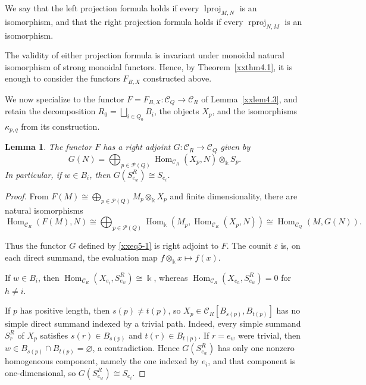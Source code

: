\documentclass{amsart}
\DeclareMathOperator{\lproj}{lproj}
\DeclareMathOperator{\rproj}{rproj}
\newtheorem{lemma}[theorem]{Lemma}
\theoremstyle{definition}
\theoremstyle{remark}
\numberwithin{equation}{section}
\begin{document}
We say that the left projection formula holds if every
$\lproj_{M,N}$
is an isomorphism, and that the right projection formula holds if every
$\rproj_{N,M}$
is an isomorphism.

The validity of either projection formula is invariant under monoidal
natural isomorphism of strong monoidal functors. Hence, by
Theorem~\ref{xxthm4.1}, it is enough to consider
the functors $F_{B,X}$ constructed above.

We now specialize to the functor
$F=F_{B,X}\colon\mathcal C_Q\to\mathcal C_R$
of Lemma~\ref{xxlem4.3}, and retain the
decomposition
$R_0=\bigsqcup_{i\in Q_0}B_i$,
the objects $X_p$, and the isomorphisms $\kappa_{p,q}$ from its
construction.

\begin{lemma}\label{xxlem5.1}
The functor $F$ has a right adjoint
$G\colon\mathcal C_R\to\mathcal C_Q$ given by
\begin{equation}\label{xxeq5-1}
G(N)
=
\bigoplus_{p\in\mathcal P(Q)}
\operatorname{Hom}_{\mathcal C_R}(X_p,N)
\otimes_{\Bbbk}S_p.
\end{equation}
In particular, if
$w\in B_i$,
then $G(S_{e_w}^R)\cong S_{e_i}$.

\end{lemma}

\begin{proof}
From $F(M)\cong\bigoplus_{p\in\mathcal P(Q)}M_p\otimes_{\Bbbk}X_p$
and finite dimensionality, there are natural isomorphisms
\[
\operatorname{Hom}_{\mathcal C_R}(F(M),N)
\cong
\bigoplus_{p\in\mathcal P(Q)}
\operatorname{Hom}_{\Bbbk}
\left(
M_p,
\operatorname{Hom}_{\mathcal C_R}(X_p,N)
\right)
\cong
\operatorname{Hom}_{\mathcal C_Q}(M,G(N)).
\]

Thus the functor $G$ defined by
\eqref{xxeq5-1}
is right adjoint to $F$.
The counit $\varepsilon$ is, on each direct summand, the evaluation map
$f\otimes_{\Bbbk} x\longmapsto f(x)$.

If $w\in B_i$, then
$\operatorname{Hom}_{\mathcal C_R}(X_{e_i},S_{e_w}^R)\cong \Bbbk$,
whereas
$\operatorname{Hom}_{\mathcal C_R}(X_{e_h},S_{e_w}^R)=0$
for $h\neq i$.

If $p$ has positive length, then
$s(p)\neq t(p)$, so
$X_p\in\mathcal C_R[B_{s(p)},B_{t(p)}]$
has no simple direct summand indexed by a trivial path.
Indeed, every simple summand $S_r^R$ of $X_p$ satisfies
$s(r)\in B_{s(p)}$ and $t(r)\in B_{t(p)}$. If $r=e_w$ were trivial, then
$w\in B_{s(p)}\cap B_{t(p)}=\varnothing$, a contradiction.
Hence $G(S_{e_w}^R)$ has only one nonzero homogeneous component, namely
the one indexed by $e_i$, and that component is one-dimensional, so
$G(S_{e_w}^R)\cong S_{e_i}$.
\end{proof}
\end{document}
